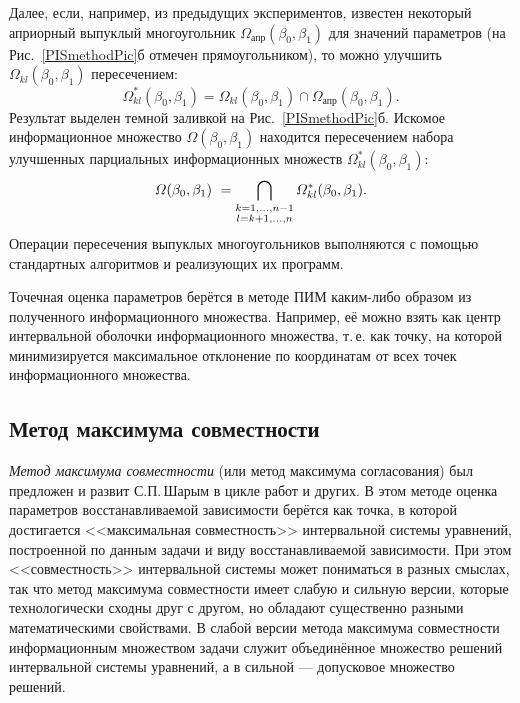 \documentclass[a5paper,openany]{book}
\begin{document}
Далее, если, например, из предыдущих экспериментов, известен некоторый априорный 
выпуклый многоугольник $\varOmega_{\text{апр}}(\beta_{0},\beta_{1})$ для значений 
параметров (на Рис.~\ref{PISmethodPic}б  отмечен прямоугольником), то можно улучшить 
$\varOmega_{kl}(\beta_{0}, \beta_{1})$ пересечением: 
\begin{equation*} 
\varOmega^{\ast}_{kl}(\beta_{0}, \beta_{1})=\varOmega_{kl}(\beta_{0}, \beta_{1}) 
   \cap \varOmega_{\text{апр}}(\beta_{0}, \beta_{1}). 
\end{equation*} 
Результат выделен темной заливкой на Рис.~\ref{PISmethodPic}б. Искомое информационное 
множество $\varOmega(\beta_{0}, \beta_{1})$ находится пересечением набора улучшенных 
парциальных информационных множеств $\varOmega^{\ast}_{kl}(\beta_{0}, \beta_{1})$: 
\begin{equation*} 
\varOmega(\beta_{0}, \beta_{1}) \  = 
   \bigcap_{\begin{subarray}{c} k = 1,\ldots, n-1\\* l= k+1,\ldots,n\end{subarray}} 
   \varOmega^{\ast}_{kl}(\beta_{0}, \beta_{1}). 
\end{equation*} 
Операции пересечения выпуклых многоугольников выполняются с помощью стандартных 
алгоритмов и реализующих их программ. 
  
Точечная оценка параметров берётся в методе ПИМ каким-либо образом из полученного 
информационного множества. Например, её можно взять как центр интервальной оболочки 
информационного множества, т.\,е. как точку, на которой минимизируется максимальное 
отклонение по координатам от всех точек информационного множества. 
   
   
\subsection{Метод максимума совместности} 
\label{MCMSect} 
  
  
\textit{Метод максимума совместности} (или метод максимума согласования) был предложен 
и развит С.П.\,Шарым в цикле работ \cite{SShary2012, SharysJCT2013, SSharyIzvAN2017, 
SSharyPLab2020, SSharyJGO2016, SSharyADSAA} и других. В этом методе оценка параметров 
восстанавливаемой зависимости берётся как точка, в которой достигается <<максимальная 
совместность>> интервальной системы уравнений, построенной по данным задачи и виду 
восстанавливаемой зависимости. При этом <<совместность>> интервальной системы может 
пониматься в разных смыслах, так что метод максимума совместности имеет слабую и сильную 
версии, которые технологически сходны друг с другом, но обладают существенно разными 
математическими свойствами.  В слабой версии 
метода максимума совместности информационным 
множеством задачи служит объединённое множество решений интервальной системы уравнений, 
а в сильной --- допусковое множество решений. 
  
\end{document}
